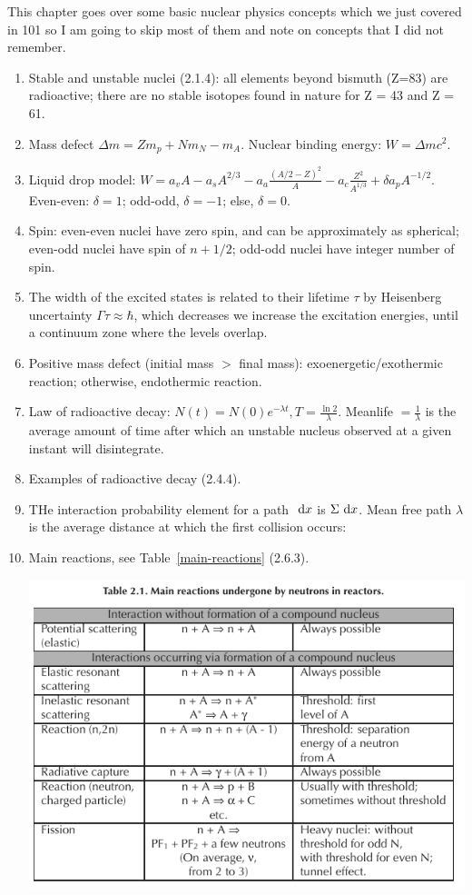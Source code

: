 \documentclass{school-22.211-notes}
\begin{document}
This chapter goes over some basic nuclear physics concepts which we just covered in 101 so I am going to skip most of them and note on concepts that I did not remember.
\begin{enumerate}
\item Stable and unstable nuclei (2.1.4): all elements beyond bismuth (Z=83) are radioactive; there are no stable isotopes found in nature for Z = 43 and Z = 61. 
\item Mass defect $\Delta m = Z m_p + N m_N - m_A$. Nuclear binding energy: $W = \Delta m c^2$. 
\item Liquid drop model: $W = a_v A - a_s A^{2/3} - a_a \frac{(A/2 - Z)^2}{A} - a_c \frac{Z^2}{A^{1/3}} + \delta a_p A^{-1/2}.$ Even-even: $\delta = 1$; odd-odd, $\delta = -1$; else, $\delta = 0$. 
\item Spin: even-even nuclei have zero spin, and can be approximately as spherical; even-odd nuclei have spin of $n+1/2$; odd-odd nuclei have integer number of spin. 
\item The width of the excited states is related to their lifetime $\tau$ by Heisenberg uncertainty $\Gamma \tau \approx \hbar$, which decreases we increase the excitation energies, until a continuum zone where the levels overlap. 
\item Positive mass defect (initial mass $>$ final mass): exoenergetic/exothermic reaction; otherwise, endothermic reaction. 
\item Law of radioactive decay: $N(t) = N(0) e^{-\lambda t}, T = \frac{\ln 2}{\lambda}$. Meanlife $=\frac{1}{\lambda}$ is the average amount of time after which an unstable nucleus observed at a given instant will disintegrate.  
\item Examples of radioactive decay (2.4.4).
\item THe interaction probability element for a path $\mbox{ }\mathrm{d} x$ is $\Sigma \mbox{ }\mathrm{d} x$. Mean free path $\lambda$ is the average distance at which the first collision occurs:
\item Main reactions, see Table~\ref{main-reactions} (2.6.3).
  \begin{table}
    \centering
    \includegraphics[width=5in]{images/intro/main-reactions.png}

\end{table}
\end{enumerate}
\end{document}

